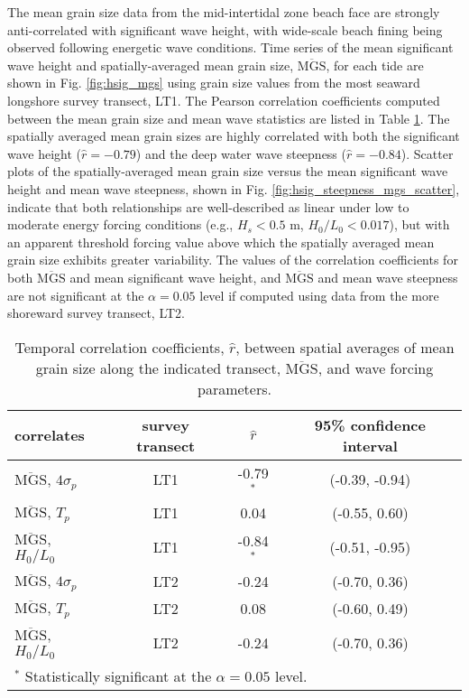 The mean grain size data from the mid-intertidal zone beach face are strongly anti-correlated with significant wave height, with wide-scale beach fining being observed following energetic wave conditions. Time series of the mean significant wave height and spatially-averaged mean grain size, $\overline{\mathrm{MGS}}$, for each tide are shown in Fig. \ref{fig:hsig_mgs} using grain size values from the most seaward longshore survey transect, LT1. The Pearson correlation coefficients computed between the mean grain size and mean wave statistics are listed in Table \ref{table:temporal_correlations}. The spatially averaged mean grain sizes are highly correlated with both the significant wave height ($\hat{r}=-0.79$) and the deep water wave steepness ($\hat{r}=-0.84$). Scatter plots of the spatially-averaged mean grain size versus the mean significant wave height and mean wave steepness, shown in Fig. \ref{fig:hsig_steepness_mgs_scatter}, indicate that both relationships are well-described as linear under low to moderate energy forcing conditions (e.g., $H_s < 0.5$ m, $H_0/L_0 < 0.017$), but with an apparent threshold forcing value above which the spatially averaged mean grain size exhibits greater variability. The values of the correlation coefficients for both $\overline{\mathrm{MGS}}$ and mean significant wave height, and $\overline{\mathrm{MGS}}$ and mean wave steepness are not significant at the $\alpha=0.05$ level if computed using data from the more shoreward survey transect, LT2.

\begin{table}[tbp!]
	\caption[Temporal correlation coefficients: mean grain size and wave parameters]{Temporal correlation coefficients, $\hat{r}$, between spatial averages of mean grain size along the indicated transect, $\overline{\mathrm{MGS}}$, and wave forcing parameters.\label{table:temporal_correlations}} 
	\centering
	\begin{tabular}{lccc}
		\hline
		correlates & survey transect & $\hat{r}$ & 95\% confidence interval\\
		\hline
		$\overline{\mathrm{MGS}}$, $4\sigma_p$ & LT1 & -0.79$^{*}$ & (-0.39, -0.94)\\
		$\overline{\mathrm{MGS}}$, $T_p$ & LT1 & 0.04 & (-0.55, 0.60)\\
		$\overline{\mathrm{MGS}}$, $H_0/L_0$ & LT1 & -0.84$^{*}$ & (-0.51, -0.95)\\
		$\overline{\mathrm{MGS}}$, $4\sigma_p$ & LT2 & -0.24 & (-0.70, 0.36)\\
		$\overline{\mathrm{MGS}}$, $T_p$ & LT2 & 0.08 & (-0.60, 0.49)\\
		$\overline{\mathrm{MGS}}$, $H_0/L_0$ & LT2 & -0.24 & (-0.70, 0.36)\\
		\hline
		\multicolumn{4}{l}{$^{*}$ Statistically significant at the $\alpha=0.05$ level.}
	\end{tabular}
\end{table}

